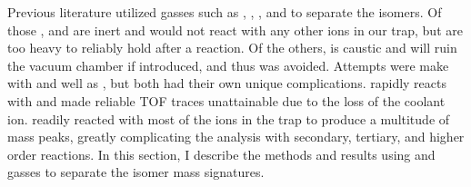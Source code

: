 Previous literature utilized gasses such as , , , and  to separate the isomers. Of those , and  are inert and would not react with any other ions in our trap, but are too heavy to reliably hold after a reaction. Of the others,  is caustic and will ruin the vacuum chamber if introduced, and thus was avoided. Attempts were make with  and well as , but both had their own unique complications.  rapidly reacts with  and made reliable TOF traces unattainable due to the loss of the coolant ion.  readily reacted with most of the ions in the trap to produce a multitude of mass peaks, greatly complicating the analysis with secondary, tertiary, and higher order reactions. In this section, I describe the methods and results using  and  gasses to separate the isomer mass signatures.